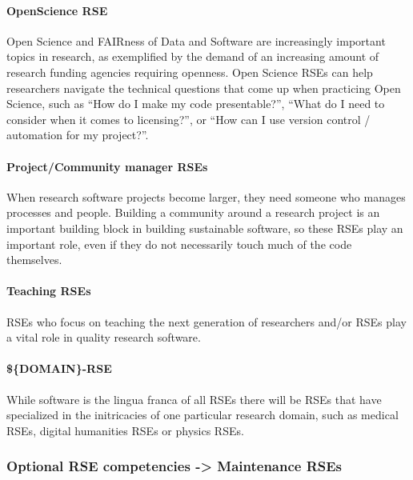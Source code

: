 \documentclass[a4paper
]{article}
\begin{document}
\hypertarget{openscience-rse}{%
\paragraph{OpenScience RSE}\label{openscience-rse}}

Open Science and FAIRness of Data and Software are increasingly
important topics in research, as exemplified by the demand of an
increasing amount of research funding agencies requiring openness. Open
Science RSEs can help researchers navigate the technical questions that
come up when practicing Open Science, such as ``How do I make my code
presentable?'', ``What do I need to consider when it comes to
licensing?'', or ``How can I use version control / automation for my
project?''.

\hypertarget{projectcommunity-manager-rses}{%
\paragraph{Project/Community manager
RSEs}\label{projectcommunity-manager-rses}}

When research software projects become larger, they need someone who
manages processes and people. Building a community around a research
project is an important building block in building sustainable software,
so these RSEs play an important role, even if they do not necessarily
touch much of the code themselves.

\hypertarget{teaching-rses}{%
\paragraph{Teaching RSEs}\label{teaching-rses}}

RSEs who focus on teaching the next generation of researchers and/or
RSEs play a vital role in quality research software.

\hypertarget{domain-rse}{%
\paragraph{\$\{DOMAIN\}-RSE}\label{domain-rse}}

While software is the lingua franca of all RSEs there will be RSEs that
have specialized in the initricacies of one particular research domain,
such as medical RSEs, digital humanities RSEs or physics RSEs.

\hypertarget{optional-rse-competencies---maintenance-rses}{%
\subsubsection{Optional RSE competencies -\textgreater{} Maintenance
RSEs}\label{optional-rse-competencies---maintenance-rses}}
\end{document}
